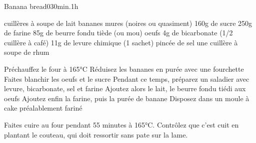{\renewcommand{\section}[1]{}

\section{Banana bread}
\begin{recette}{Banana bread}{0}{30min.}{1h}
\begin{ingredients}
 cuillères à soupe de lait
 bananes mures (noires ou quasiment)
\ingredient 160g de sucre
\ingredient 250g de farine
\ingredient 85g de beurre fondu tiède (ou mou)
 oeufs
\ingredient 4g de bicarbonate (1/2 cuillère à café)
\ingredient 11g de levure chimique (1 sachet)
 pincée de sel
\ingredient une cuillère à soupe de rhum
\end{ingredients}

\begin{preparation}
\etape Préchauffez le four à 165°C
\etape Réduisez les bananes en purée avec une fourchette
\etape Faites blanchir les oeufs et le sucre
\etape Pendant ce temps, préparez un saladier avec levure, bicarbonate, sel et farine
\etape Ajoutez alors le lait, le beurre fondu tiédi aux oeufs
\etape Ajoutez enfin la farine, puis la purée de banane
\etape Disposez dans un moule à cake préalablement fariné
\end{preparation}

\begin{cuisson}
Faites cuire au four pendant 55 minutes à 165°C. Contrôlez 
que c'est cuit en plantant le couteau, qui doit ressortir sans pate sur la lame.
\end{cuisson}
\end{recette}

}
